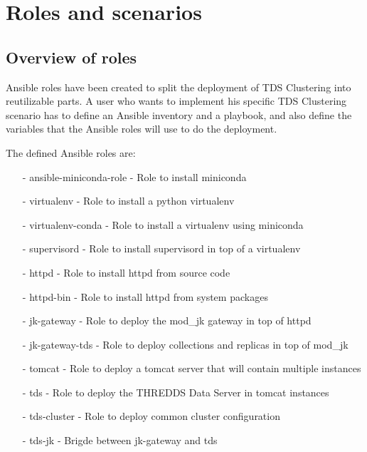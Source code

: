 \documentclass[a4paper,12pt]{article}
\begin{document}
\section{Roles and scenarios}

\subsection{Overview of roles}

Ansible roles have been created to split the deployment of TDS Clustering into reutilizable parts. A user who wants to implement his specific TDS Clustering scenario has to define an Ansible inventory and a playbook, and also define the variables that the Ansible roles will use to do the deployment.

The defined Ansible roles are:

\begin{itemize}
\item[-] ansible-miniconda-role - Role to install miniconda
\item[-] virtualenv - Role to install a python virtualenv
\item[-] virtualenv-conda - Role to install a virtualenv using miniconda
\item[-] supervisord - Role to install supervisord in top of a virtualenv
\item[-] httpd - Role to install httpd from source code
\item[-] httpd-bin - Role to install httpd from system packages
\item[-] jk-gateway - Role to deploy the mod\_jk gateway in top of httpd
\item[-] jk-gateway-tds - Role to deploy collections and replicas in top of mod\_jk
\item[-] tomcat - Role to deploy a tomcat server that will contain multiple instances
\item[-] tds - Role to deploy the THREDDS Data Server in tomcat instances
\item[-] tds-cluster - Role to deploy common cluster configuration
\item[-] tds-jk - Brigde between jk-gateway and tds
\end{itemize}
\end{document}

